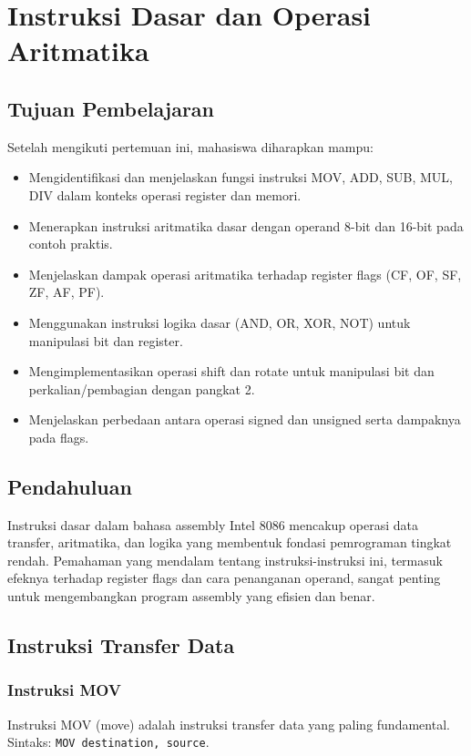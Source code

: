 \chapter{Instruksi Dasar dan Operasi Aritmatika}\label{ch:instruksi-dasar}

\section{Tujuan Pembelajaran}\label{sec:instruksi-dasar-tujuan}
Setelah mengikuti pertemuan ini, mahasiswa diharapkan mampu:
\begin{itemize}
    \item Mengidentifikasi dan menjelaskan fungsi instruksi MOV, ADD, SUB, MUL, DIV dalam konteks operasi register dan memori.
    \item Menerapkan instruksi aritmatika dasar dengan operand 8-bit dan 16-bit pada contoh praktis.
    \item Menjelaskan dampak operasi aritmatika terhadap register flags (CF, OF, SF, ZF, AF, PF).
    \item Menggunakan instruksi logika dasar (AND, OR, XOR, NOT) untuk manipulasi bit dan register.
    \item Mengimplementasikan operasi shift dan rotate untuk manipulasi bit dan perkalian/pembagian dengan pangkat 2.
    \item Menjelaskan perbedaan antara operasi signed dan unsigned serta dampaknya pada flags.
\end{itemize}

\section{Pendahuluan}\label{sec:instruksi-dasar-pendahuluan}
Instruksi dasar dalam bahasa assembly Intel 8086 mencakup operasi data transfer, aritmatika, dan logika yang membentuk fondasi pemrograman tingkat rendah. Pemahaman yang mendalam tentang instruksi-instruksi ini, termasuk efeknya terhadap register flags dan cara penanganan operand, sangat penting untuk mengembangkan program assembly yang efisien dan benar.

\section{Instruksi Transfer Data}\label{sec:instruksi-dasar-transfer}
\subsection{Instruksi MOV}
Instruksi MOV (move) adalah instruksi transfer data yang paling fundamental. Sintaks: \texttt{MOV destination, source}.


